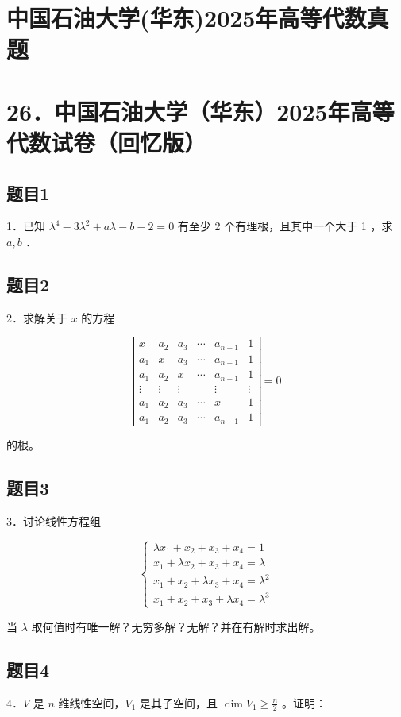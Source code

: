 \documentclass{article}
\begin{document}
\section*{中国石油大学(华东)2025年高等代数真题}
\section*{26．中国石油大学（华东）2025年高等代数试卷（回忆版）}

\subsection{题目1}
1．已知 \(\lambda^{4}-3 \lambda^{2}+a \lambda-b-2=0\) 有至少 2 个有理根，且其中一个大于 1 ，求 \(a, b\) ．

\subsection{题目2}
2．求解关于 \(x\) 的方程

\[
\left|\begin{array}{cccccc}
x & a_{2} & a_{3} & \cdots & a_{n-1} & 1 \\
a_{1} & x & a_{3} & \cdots & a_{n-1} & 1 \\
a_{1} & a_{2} & x & \cdots & a_{n-1} & 1 \\
\vdots & \vdots & \vdots & & \vdots & \vdots \\
a_{1} & a_{2} & a_{3} & \cdots & x & 1 \\
a_{1} & a_{2} & a_{3} & \cdots & a_{n-1} & 1
\end{array}\right|=0
\]

的根。

\subsection{题目3}
3．讨论线性方程组

\[
\left\{\begin{array}{l}
\lambda x_{1}+x_{2}+x_{3}+x_{4}=1 \\
x_{1}+\lambda x_{2}+x_{3}+x_{4}=\lambda \\
x_{1}+x_{2}+\lambda x_{3}+x_{4}=\lambda^{2} \\
x_{1}+x_{2}+x_{3}+\lambda x_{4}=\lambda^{3}
\end{array}\right.
\]

当 \(\lambda\) 取何值时有唯一解？无穷多解？无解？并在有解时求出解。

\subsection{题目4}
4．\(V\) 是 \(n\) 维线性空间，\(V_{1}\) 是其子空间，且 \(\operatorname{dim} V_{1} \geq \frac{n}{2}\) 。证明：
\end{document}
